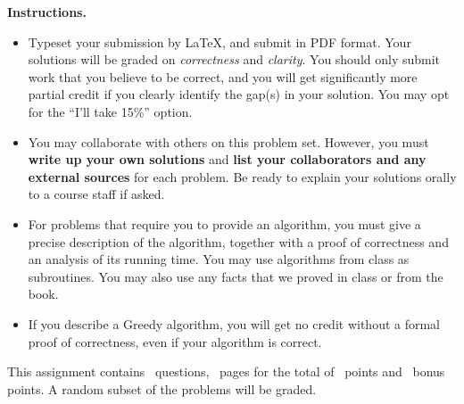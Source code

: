 \noindent \textbf{Instructions.}

\begin{itemize} 
\item Typeset your submission by \LaTeX, and submit in PDF
  format. Your solutions will be graded on \emph{correctness} and
  \emph{clarity}. You should only submit work that you believe to be
  correct, and you will get significantly more partial credit if you
  clearly identify the gap(s) in your solution. You may opt for the
  ``I’ll take 15\%'' option.
\item You may collaborate with others on this problem set.  However,
  you must \textbf{{write up your own solutions}} and \textbf{{list
      your collaborators and any external sources}} for each
  problem. Be ready to explain your solutions orally to a course staff
  if asked.
\item For problems that require you to provide an algorithm, you must
  give a precise description of the algorithm, together with a proof
  of correctness and an analysis of its running time. You may use
  algorithms from class as subroutines. You may also use any facts
  that we proved in class or from the book.
\item {If you describe a Greedy algorithm, you will get no
    credit without a formal proof of correctness, even if your
    algorithm is correct.}
\end{itemize}

\noindent This assignment contains \numquestions\ questions,
\numpages\ pages for the total of \numpoints \ points and
\numbonuspoints\ bonus points. A random subset of the problems will be
graded. \medskip

\newpage 

